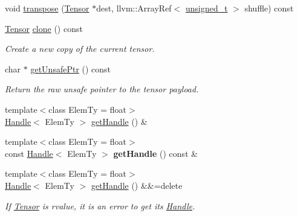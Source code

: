 \begin{DoxyCompactItemize}
\item 
void \hyperlink{classglow_1_1_tensor_a111b8eb06a33746bdd520931f940b520}{transpose} (\hyperlink{classglow_1_1_tensor}{Tensor} $\ast$dest, llvm\+::\+Array\+Ref$<$ \hyperlink{namespaceglow_a0ca574644e1e42ef193a9947fb4d8911}{unsigned\+\_\+t} $>$ shuffle) const
\item 
\mbox{\label{classglow_1_1_tensor_a4ba0d361088018e1cb85a34e5e75b4f5}} 
\hyperlink{classglow_1_1_tensor}{Tensor} \hyperlink{classglow_1_1_tensor_a4ba0d361088018e1cb85a34e5e75b4f5}{clone} () const
\begin{DoxyCompactList}\small\item\em Create a new copy of the current tensor. \end{DoxyCompactList}\item 
\mbox{\label{classglow_1_1_tensor_a82545ea7f472278da9479508f1018d18}} 
char $\ast$ \hyperlink{classglow_1_1_tensor_a82545ea7f472278da9479508f1018d18}{get\+Unsafe\+Ptr} () const
\begin{DoxyCompactList}\small\item\em Return the raw unsafe pointer to the tensor payload. \end{DoxyCompactList}\item 
{\footnotesize template$<$class Elem\+Ty  = float$>$ }\\\hyperlink{classglow_1_1_handle}{Handle}$<$ Elem\+Ty $>$ \hyperlink{classglow_1_1_tensor_a3145589191c1d1a4fd79f5c2f1215860}{get\+Handle} () \&
\item 
\mbox{\label{classglow_1_1_tensor_acbd750d3ec78725e4629479519430807}} 
{\footnotesize template$<$class Elem\+Ty  = float$>$ }\\const \hyperlink{classglow_1_1_handle}{Handle}$<$ Elem\+Ty $>$ {\bfseries get\+Handle} () const \&
\item 
\mbox{\label{classglow_1_1_tensor_a2d10a5548da1a2bea1f4c52874ddf41c}} 
{\footnotesize template$<$class Elem\+Ty  = float$>$ }\\\hyperlink{classglow_1_1_handle}{Handle}$<$ Elem\+Ty $>$ \hyperlink{classglow_1_1_tensor_a2d10a5548da1a2bea1f4c52874ddf41c}{get\+Handle} () \&\&=delete
\begin{DoxyCompactList}\small\item\em If \hyperlink{classglow_1_1_tensor}{Tensor} is rvalue, it is an error to get its \hyperlink{classglow_1_1_handle}{Handle}. \end{DoxyCompactList}\item 

\end{DoxyCompactItemize}
